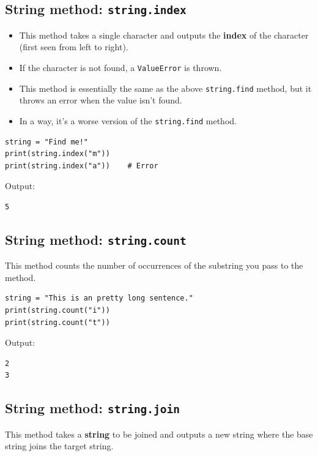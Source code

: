 \documentclass[11pt]{article}
\begin{document}
 \newpage

\subsection{String method: \texttt{string.index}}
\label{sec:org5a77031}
\begin{itemize}
\item This method takes a single character and outputs the \textbf{index} of the character (first seen from left to right).
\item If the character is not found, a \texttt{ValueError} is thrown.
\item This method is essentially the same as the above \texttt{string.find} method, but it throws an error when the value isn't found.
\item In a way, it's a worse version of the \texttt{string.find} method.
\end{itemize}

\begin{verbatim}
string = "Find me!"
print(string.index("m"))
print(string.index("a"))    # Error
\end{verbatim}

 \noindent Output:

\begin{verbatim}
5
\end{verbatim}

\subsection{String method: \texttt{string.count}}
\label{sec:org8238184}
This method counts the number of occurrences of the substring you pass to the method.

\begin{verbatim}
string = "This is an pretty long sentence."
print(string.count("i"))
print(string.count("t"))
\end{verbatim}

 \noindent Output:

\begin{verbatim}
2
3
\end{verbatim}


 \newpage

\subsection{String method: \texttt{string.join}}
\label{sec:org033371e}
This method takes a \textbf{string} to be joined and outputs a new string where the base string joins the target string.
\end{document}
